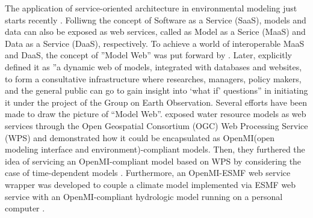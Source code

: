 \documentclass[review]{elsarticle}
\begin{document}
The application of service-oriented architecture in environmental modeling just starts recently \citep{castronova2013, mineter2003, granell2010, goodall2011, goodall2013}. Folliwng the concept of Software as a Service (SaaS), models and data can also be exposed as web services, called as Model as a Serice (MaaS) and Data as a Service (DaaS), respectively. To achieve a world of interoperable MaaS and DaaS, the concept of ''Model Web'' was put forward by \citep{geller2008}. Later, \cite{nativi2013} explicitly defined it as ''a dynamic web of models, integrated with databases and websites, to form a consultative infrastructure where researches, managers, policy makers, and the general public can go to gain insight into ‘what if’ questions'' in initiating it under the project of the Group on Earth Observation. Several efforts have been made to draw the picture of “Model Web”. \citet{goodall2011} exposed water resource models as web services through the Open Geospatial Consortium (OGC) Web Processing Service (WPS) and demonstrated how it could be encapsulated as OpenMI(open modeling interface and environment)-compliant models. Then, they furthered the idea of servicing an OpenMI-compliant model based on WPS by considering the case of time-dependent models \citep{castronova2013}. Furthermore, an OpenMI-ESMF web service wrapper was developed to couple a climate model implemented via ESMF web service with an OpenMI-compliant hydrologic model running on a personal computer \citep{goodall2013}.
\end{document}
